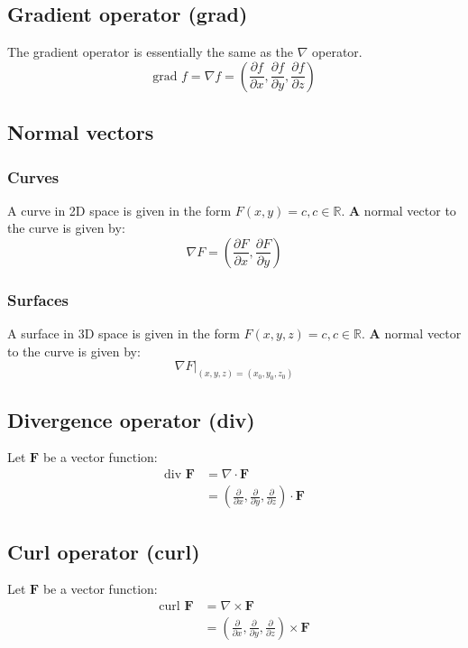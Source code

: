 \documentclass[11pt]{article}
\begin{document}
\subsection{Gradient operator (grad)}
\label{sec:org544e7e5}
The gradient operator is essentially the same as the \(\nabla\) operator.
\[\text{grad } f = \nabla f = \left(\frac{\partial f}{\partial x}, \frac{\partial f}{\partial y}, \frac{\partial f}{\partial z} \right)\]

\subsection{Normal vectors}
\label{sec:org2ca4da2}

\subsubsection{Curves}
\label{sec:org38ae90d}
A curve in 2D space is given in the form \(F(x, y) = c, c \in \mathbb{R}\). \textbf{A} normal vector to the curve is given by:
\[\nabla F = \left(\frac{\partial F}{\partial x}, \frac{\partial F}{\partial y} \right)\]

\subsubsection{Surfaces}
\label{sec:org3624c3c}
A surface in 3D space is given in the form \(F(x, y, z) = c, c \in \mathbb{R}\). \textbf{A} normal vector to the curve is given by:
\[\left. \nabla F \right|_{(x, y, z) = (x_0, y_0, z_0)}\]

\subsection{Divergence operator (div)}
\label{sec:orgc16f6fc}
Let \(\boldsymbol{F}\) be a vector function:
\begin{align*}
\text{div } \boldsymbol{F} &= \nabla \cdot \boldsymbol{F} \\
&= \left(\frac{\partial}{\partial x}, \frac{\partial}{\partial y}, \frac{\partial}{\partial z} \right) \cdot \boldsymbol{F}
\end{align*}

\subsection{Curl operator (curl)}
\label{sec:org1470333}
Let \(\boldsymbol{F}\) be a vector function:
\begin{align*}
\text{curl } \boldsymbol{F} &= \nabla \times \boldsymbol{F} \\
&= \left(\frac{\partial}{\partial x}, \frac{\partial}{\partial y}, \frac{\partial}{\partial z} \right) \times \boldsymbol{F}
\end{align*}
\end{document}
